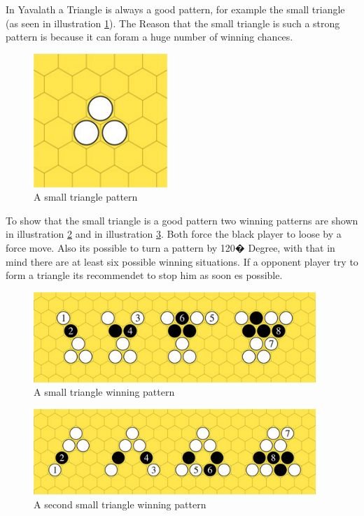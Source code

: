 \documentclass[german]{report}
\begin{document}
In Yavalath a Triangle is always a good pattern, for example the small triangle (as seen in illustration \ref{fig:yav_smallTriangle}). The Reason that the small triangle is such a strong pattern is because it can foram a huge number of winning chances. 


\begin{figure}[ht]
\centering
\includegraphics[width=0.45\textwidth]{Abbildungen/yav_smallTriangle.png}
\caption[A small triangle pattern, Source:\cite{yvalathBGG}]{A small triangle pattern}
\label{fig:yav_smallTriangle}
\end{figure}

To show that the small triangle is a good pattern two winning patterns are shown in illustration \ref{fig:yav_smallTriangleWin1} and in illustration \ref{fig:yav_smallTriangleWin2}. Both force the black player to loose by a force move. Also its possible to turn a pattern by 120� Degree, with that in mind there are at least six possible winning situations. If a opponent player try to form a triangle its recommendet to stop him as soon es possible.\cite{yvalathBGG}



\begin{figure}[ht]
\centering
\includegraphics[width=0.95\textwidth]{Abbildungen/yav_smallTriangleWin1.png}
\caption[A small triangle winning pattern, Source:\cite{yvalathBGG}]{A small triangle winning pattern}
\label{fig:yav_smallTriangleWin1}
\end{figure}

\begin{figure}[ht]
\centering
\includegraphics[width=0.95\textwidth]{Abbildungen/yav_smallTriangleWin2.png}
\caption[A second small triangle winning pattern, Source:\cite{yvalathBGG}]{A second small triangle winning pattern}
\label{fig:yav_smallTriangleWin2}
\end{figure}
\end{document}
